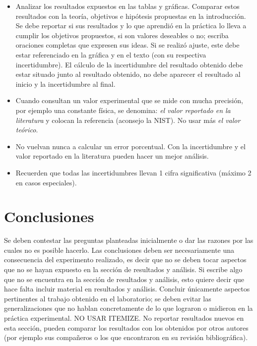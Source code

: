 \documentclass[a4paper, amsfonts, amssymb, amsmath, reprint, showkeys, nofootinbib, twoside]{revtex4-1}
\begin{document}
\begin{itemize}
    \item Analizar los resultados expuestos en las tablas y gráficas. Comparar estos resultados con la teoría, objetivos e hipótesis propuestas en la introducción. Se debe reportar si sus resultados y lo que aprendió en la práctica lo lleva a cumplir los objetivos propuestos, si son valores deseables o no; escriba oraciones completas que expresen sus ideas. Si se realizó ajuste, este debe estar referenciado en la gráfica y en el texto (con su respectiva incertidumbre). El cálculo de la incertidumbre del resultado obtenido debe estar situado junto al resultado obtenido, no debe aparecer el resultado al inicio y la incertidumbre al final.
    \item Cuando consultan un valor experimental que se mide con mucha precisión, por ejemplo una constante física, se denomina: \emph{el valor reportado en la literatura} y colocan la referencia (aconsejo la NIST). No usar más \emph{el valor teórico}.
    \item No vuelvan nunca a calcular un error porcentual. Con la incertidumbre y el valor reportado en la literatura pueden hacer un mejor análisis.
    \item Recuerden que todas las incertidumbres llevan 1 cifra significativa (máximo 2 en casos especiales).

\end{itemize}





\section{Conclusiones}

Se deben contestar las preguntas planteadas inicialmente o dar las razones por las cuales no es posible hacerlo. Las conclusiones deben ser necesariamente una consecuencia del experimento realizado, es  decir  que  no  se  deben  tocar  aspectos  que  no  se  hayan  expuesto  en  la  sección  de resultados y análisis. Si escribe algo que no se encuentra en la sección de resultados y análisis,  esto quiere decir que hace falta incluir material en resultados y análisis. Concluir únicamente aspectos pertinentes al trabajo obtenido en el laboratorio; se deben evitar las generalizaciones que no hablan concretamente de lo que lograron o midieron en la práctica experimental. NO USAR ITEMIZE. No reportar resultados nuevos en esta sección, pueden comparar los resultados con los obtenidos por otros autores (por ejemplo sus compañeros o los que encontraron en su revisión bibliográfica).
\end{document}
